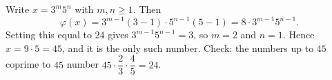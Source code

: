 Write $x=3^m5^n$ with $m,n\ge1$. Then
\[
\varphi(x)=3^{m-1}(3-1)\cdot5^{n-1}(5-1)=8\cdot3^{m-1}5^{n-1}.
\]
Setting this equal to $24$ gives $3^{m-1}5^{n-1}=3$, so $m=2$ and $n=1$. Hence $x=9\cdot5=\boxed{45}$, and it is the only such number. Check: the numbers up to $45$ coprime to $45$ number $45\cdot\dfrac{2}{3}\cdot\dfrac{4}{5}=24$.
